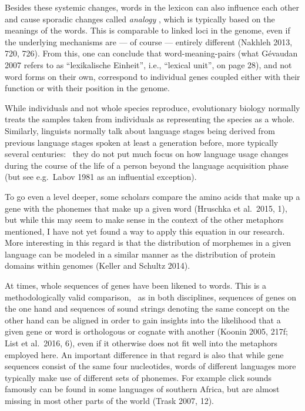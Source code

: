 \documentclass[
  a4paper,
  14pt,
  oneside,
  tablecaptionabove
]{scrbook}
\begin{document}
Besides these systemic changes, words in the lexicon can also influence
each other and cause sporadic changes called \emph{analogy} , which is
typically based on the meanings of the words. This is comparable to
linked loci in the genome, even if the underlying mechanisms are ­­---
of course --- entirely different (Nakhleh 2013, 720, 726). From this,
one can conclude that word-meaning-pairs (what Gévaudan 2007 refers to
as \enquote{lexikalische Einheit}, i.e., \enquote{lexical unit}, on page
28), and not word forms on their own, correspond to individual genes
coupled either with their function or with their position in the genome.

While individuals and not whole species reproduce, evolutionary biology
normally treats the samples taken from individuals as representing the
species as a whole. Similarly, linguists normally talk about language
stages being derived from previous language stages spoken at least a
generation before, more typically several centuries:~ they do not put
much focus on how language usage changes during the course of the life
of a person beyond the language acquisition phase (but see e.g.~Labov
1981 as an influential exception).

To go even a level deeper, some scholars compare the amino acids that
make up a gene with the phonemes that make up a given word (Hruschka et
al.~2015, 1), but while this may seem to make sense in the context of
the other metaphors mentioned, I have not yet found a way to apply this
equation in our research. More interesting in this regard is that the
distribution of morphemes in a given language can be modeled in a
similar manner as the distribution of protein domains within genomes
(Keller and Schultz 2014).

At times, whole sequences of genes have been likened to words. This is a
methodologically valid comparison,~ as in both disciplines, sequences of
genes on the one hand and sequences of sound strings denoting the same
concept on the other hand can be aligned in order to gain insights into
the likelihood that a given gene or word is orthologous or cognate with
another (Koonin 2005, 217f; List et al.~2016, 6), even if it otherwise
does not fit well into the metaphors employed here. An important
difference in that regard is also that while gene sequences consist of
the same four nucleotides, words of different languages more typically
make use of different sets of phonemes. For example click sounds
famously can be found in some languages of southern Africa, but are
almost missing in most other parts of the world (Trask 2007, 12).
\end{document}
